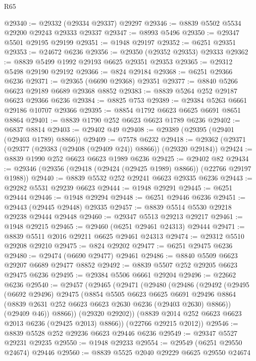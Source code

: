 \begin{lexlean}{R65}
\begin{coremodule}
{@29340 := @29332 (@29334 @29337) @29297
@29346 := @8839 @5502 @5534 @29200 @29243 @29333 @29337
@29347 := @8993 @5496
@29350 := @29347 @5501 @29195 @29199
@29351 := @1948 @29197
@29352 := @6251 @29351
@29353 := @24672 @6236
@29356 := @29350 (@29352 @29353) @29333
@29362 := @8839 @5499 @1992 @29193 @6625 @29351 @29353
@29365 := @29312 @5498 @29190 @29192
@29366 := @824 @29184
@29368 := @6251 @29366 @6236
@29371 := @29365 (@6690 @29368) @29351
@29377 := @8840 @5266 @6623 @29189 @6689 @29368 @8852
@29383 := @8839 @5264 @252 @29187 @6623 @29366 @6236
@29384 := @8825 @753
@29389 := @29384 @5263 @6661 @29186 @10707 @29366
@29395 := @8854 @1792 @6623 @6625 @6691 @8651 @8864
@29401 := @8839 @1790 @252 @6623 @6623 @1789 @6236
@29402 := @6837 @8814
@29403 := @29402 @49
@29408 := @29389 (@29395 (@29401 (@29403 @1789) @8866))
@29409 := @7578 @6232
@29418 := @29362 (@29371 (@29377 (@29383 (@29408 (@29409 @24)) @8866)) (@29320 @29184))
@29424 := @8839 @1990 @252 @6623 @6623 @1989 @6236
@29425 := @29402 @82
@29434 := @29346 (@29356 (@29418 (@29424 (@29425 @1989) @8866)) (@22766 @29197 @1988))
@29440 := @8839 @5532 @252 @29241 @6623 @29335 @6236
@29443 := @29282 @5531 @29239 @6623
@29444 := @1948 @29291
@29445 := @6251 @29444
@29446 := @1948 @29294
@29448 := @6251 @29446 @6236
@29451 := @29443 (@29445 @29448) @29335
@29457 := @8839 @5514 @5530 @29218 @29238 @29444 @29448
@29460 := @29347 @5513 @29213 @29217
@29461 := @1948 @29215
@29465 := @29460 (@6251 @29461 @24313) @29444
@29471 := @8839 @5511 @2016 @29211 @6625 @29461 @24313
@29474 := @29312 @5510 @29208 @29210
@29475 := @824 @29202
@29477 := @6251 @29475 @6236
@29480 := @29474 (@6690 @29477) @29461
@29486 := @8840 @5509 @6623 @29207 @6689 @29477 @8852
@29492 := @8839 @5507 @252 @29205 @6623 @29475 @6236
@29495 := @29384 @5506 @6661 @29204
@29496 := @22662 @6236
@29540 := @29457
    (@29465
      (@29471
        (@29480
          (@29486
            (@29492
              (@29495
                (@6692 @29496)
                @29475
                (@8854
                  @5505
                  @6623
                  @6625
                  @6691
                  @29496
                  @8864
                  (@8839 @2631 @252 @6623 @6623 @2630 @6236 (@29403 @2630) @8866))
                (@29409 @46))
              @8866))
          (@29320 @29202))
        (@8839 @2014 @252 @6623 @6623 @2013 @6236 (@29425 @2013) @8866))
      (@22766 @29215 @2012))
@29546 := @8839 @5528 @252 @29236 @6623 @29446 @6236
@29549 := @29347 @5527 @29231 @29235
@29550 := @1948 @29233
@29554 := @29549 (@6251 @29550 @24674) @29446
@29560 := @8839 @5525 @2040 @29229 @6625 @29550 @24674
}
\end{coremodule}
\end{lexlean}
